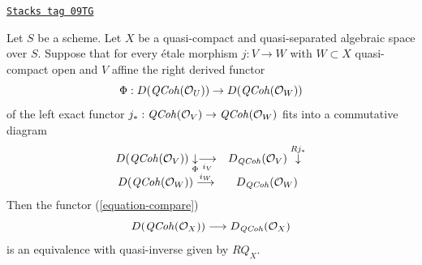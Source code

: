 \begin{lemma}
\label{spaces-perfect-lemma-argument-proves}
\href{https://stacks.math.columbia.edu/tag/09TG}{\texttt{Stacks tag 09TG}}

Let $S$ be a scheme. Let $X$ be a quasi-compact and quasi-separated
algebraic space over $S$. Suppose that for every \'etale morphism
$j : V \to W$ with $W \subset X$ quasi-compact open and $V$ affine
the right derived functor
$$
\Phi : D(\mathit{QCoh}(\mathcal{O}_U)) \to D(\mathit{QCoh}(\mathcal{O}_W))
$$
of the left exact functor
$j_* : \mathit{QCoh}(\mathcal{O}_V) \to \mathit{QCoh}(\mathcal{O}_W)$
fits into a commutative diagram
$$
\begin{array}{cc}D(\mathit{QCoh}(\mathcal{O}_V)) \underset{\Phi}{\downarrow}\underset{i_V}{\longrightarrow} & D_{\mathit{QCoh}}(\mathcal{O}_V) \overset{Rj_*}{\downarrow} \\ D(\mathit{QCoh}(\mathcal{O}_W)) \overset{i_W}{\longrightarrow} & D_{\mathit{QCoh}}(\mathcal{O}_W)\end{array}
$$
Then the functor (\ref{equation-compare})
$$
D(\mathit{QCoh}(\mathcal{O}_X))
\longrightarrow
D_{\mathit{QCoh}}(\mathcal{O}_X)
$$
is an equivalence with quasi-inverse given by $RQ_X$.
\end{lemma}

